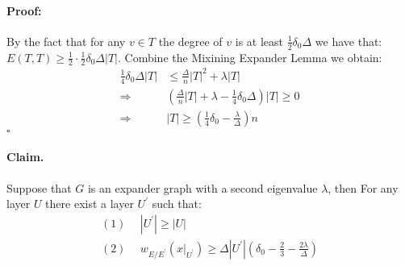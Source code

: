 \documentclass[sigplan,screen]{acmart}
\begin{document}
\begin{multicols*}{2}
  \paragraph{Proof:} By the fact that for any $v \in T$ the degree of $v$ is at least $\frac{1}{2}\delta_{0}\Delta$ we have that: $E\left( T,T \right) \ge \frac{1}{2}\cdot \frac{1}{2}\delta_{0}\Delta |T|$. Combine the Mixining Expander Lemma we obtain:
  \begin{equation*}
    \begin{split}
      \frac{1}{4}\delta_{0}\Delta |T| & \le \frac{\Delta}{n}|T|^2  + \lambda|T| \\ 
      \Rightarrow & \left( \frac{\Delta}{n}|T| + \lambda -  \frac{1}{4}\delta_{0}\Delta \right)|T| \ge 0 \\ 
      \Rightarrow & |T| \ge \left( \frac{1}{4}\delta_{0} - \frac{\lambda}{\Delta} \right)n 
    \end{split}
  \end{equation*}
  $\square$

  \paragraph{Claim.} Suppose that $G$ is an expander graph with a second eigenvalue $\lambda$, then For any layer $U$ there exist a layer $U^{\prime}$ such that:
  \begin{equation*}
    \begin{split}
      (1) & \ \ |U^{\prime}| \ge |U| \\
      (2) & \ \ w_{E/E^{\prime}}\left( x|_{U^{\prime}} \right)  \ge\Delta|U^{\prime}|\left( \delta_{0}-\frac{2}{3}-\frac{2\lambda}{\Delta} \right)
    \end{split}
  \end{equation*}

\end{multicols*}
\end{document}
